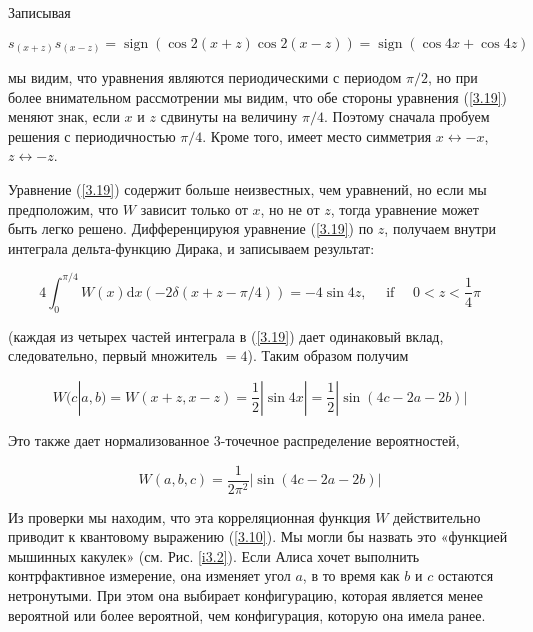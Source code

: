 \documentclass[main.tex]{subfiles}
\begin{document}
Записывая

\begin{equation}\label{3.20}
	s_{(x+z)} s_{(x-z)}=\operatorname{sign}(\cos 2(x+z) \cos 2(x-z))=\operatorname{sign}(\cos 4 x+\cos 4 z)
\end{equation}

мы видим, что уравнения являются периодическими с периодом $\pi / 2$, но при более внимательном рассмотрении мы видим, что обе стороны уравнения (\ref{3.19}) меняют знак, если $x$ и $z$ сдвинуты на величину $\pi / 4$. Поэтому сначала пробуем решения с периодичностью $\pi / 4$. Кроме того, имеет место симметрия $x \leftrightarrow - x$, $z \leftrightarrow - z$.

Уравнение (\ref{3.19}) содержит больше неизвестных, чем уравнений, но если мы предположим, что $W$ зависит только от $x$, но не от $z$, тогда уравнение может быть легко решено. Дифференцируюя уравнение (\ref{3.19}) по $z$, получаем внутри интеграла  дельта-функцию Дирака, и записываем результат:

\begin{equation}\label{3.21}
	4 \int_{0}^{\pi / 4} W(x) \mathrm{d} x(-2 \delta(x+z-\pi / 4))=-4 \sin 4 z, \quad \text { if } \quad 0<z<\frac{1}{4} \pi
\end{equation}

(каждая из четырех частей интеграла в (\ref{3.19}) дает одинаковый вклад, следовательно, первый множитель $= 4$). Таким образом получим

\begin{equation}\label{3.22}
	W(c | a, b)=W(x+z, x-z)=\frac{1}{2}|\sin 4 x|=\frac{1}{2}|\sin (4 c-2 a-2 b)|
\end{equation}

Это также дает нормализованное 3-точечное распределение вероятностей,

\begin{equation}\label{3.23}
	W(a, b, c)=\frac{1}{2 \pi^{2}}|\sin (4 c-2 a-2 b)|
\end{equation}

Из проверки мы находим, что эта корреляционная функция $W$ действительно приводит к квантовому выражению (\ref{3.10}). Мы могли бы назвать это «функцией мышинных какулек» (см. Рис. \ref{i3.2}). Если Алиса хочет выполнить контрфактивное измерение, она изменяет угол $a$, в то время как $b$ и $c$ остаются нетронутыми. При этом она выбирает конфигурацию, которая является менее вероятной или более вероятной, чем конфигурация, которую она имела ранее.
\end{document}
